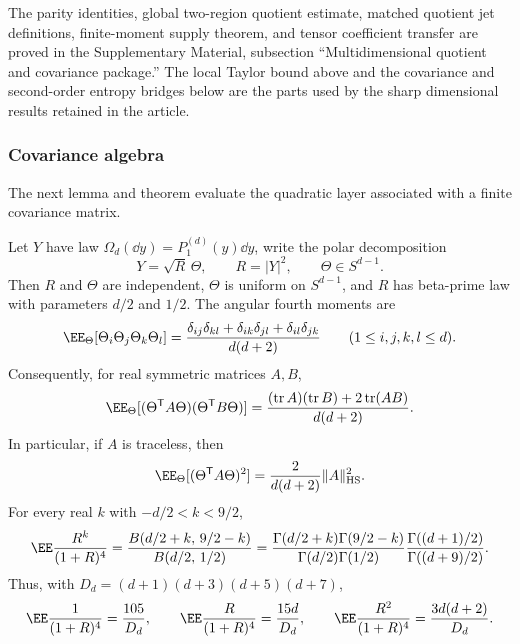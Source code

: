 \ifdefined\JFAArticleMain
The parity identities, global two-region quotient estimate, matched quotient
jet definitions, finite-moment supply theorem, and tensor coefficient transfer
are proved in the Supplementary Material, subsection
``Multidimensional quotient and covariance package.''  The local Taylor bound above and
the covariance and second-order entropy bridges below are the parts used by
the sharp dimensional results retained in the article.
\else

\fi

\subsubsection*{Covariance algebra}\leavevmode\par\smallskip

The next lemma and theorem evaluate the quadratic layer associated with a
finite covariance matrix.

\begin{lemma}%
\label{lem:radial-angular-contractions}
Let \(Y\) have law
\(\Omega_d(\dd y)=P_1^{(d)}(y)\dd y\), write the polar decomposition
\[
Y=\sqrt R\,\Theta,\qquad R=|Y|^2,\qquad \Theta\in S^{d-1}.
\]
Then \(R\) and \(\Theta\) are independent, \(\Theta\) is uniform on
\(S^{d-1}\), and \(R\) has beta-prime law with parameters \(d/2\) and
\(1/2\).  The angular fourth moments are
\begin{equation}\label{eq:spherical-fourth-contraction}
\EE_\Theta[\Theta_i\Theta_j\Theta_k\Theta_l]
=
\frac{\delta_{ij}\delta_{kl}
+\delta_{ik}\delta_{jl}
+\delta_{il}\delta_{jk}}{d(d+2)}
\qquad(1\le i,j,k,l\le d).
\end{equation}
Consequently, for real symmetric matrices \(A,B\),
\begin{equation}\label{eq:spherical-quadratic-contraction}
\EE_\Theta[
(\Theta^{\mathsf T}A\Theta)(\Theta^{\mathsf T}B\Theta)]
=
\frac{(\operatorname{tr}A)(\operatorname{tr}B)
+2\operatorname{tr}(AB)}{d(d+2)}.
\end{equation}
In particular, if \(A\) is traceless, then
\begin{equation}\label{eq:spherical-traceless-square}
\EE_\Theta[(\Theta^{\mathsf T}A\Theta)^2]
=\frac{2}{d(d+2)}\|A\|_{\rm HS}^2 .
\end{equation}
For every real \(k\) with \(-d/2<k<9/2\),
\begin{equation}\label{eq:radial-beta-prime-contraction-general}
\EE\frac{R^k}{(1+R)^4}
=
\frac{B(d/2+k,\,9/2-k)}{B(d/2,\,1/2)}
=
\frac{\Gamma(d/2+k)\Gamma(9/2-k)}
{\Gamma(d/2)\Gamma(1/2)}
\frac{\Gamma((d+1)/2)}{\Gamma((d+9)/2)} .
\end{equation}
Thus, with \(D_d=(d+1)(d+3)(d+5)(d+7)\),
\begin{equation}\label{eq:radial-beta-prime-contractions-low}
\EE\frac{1}{(1+R)^4}=\frac{105}{D_d},\qquad
\EE\frac{R}{(1+R)^4}=\frac{15d}{D_d},\qquad
\EE\frac{R^2}{(1+R)^4}=\frac{3d(d+2)}{D_d}.
\end{equation}
\end{lemma}


